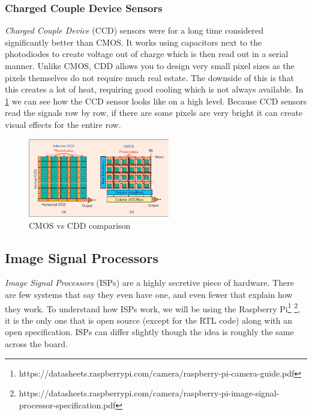 \subsubsection{Charged Couple Device Sensors}
\textit{Charged Couple Device} (CCD) sensors were for a long time considered
significantly better than CMOS. It works using capacitors next to the
photodiodes to create voltage out of charge which is then read out in a serial
manner. Unlike CMOS, CDD allows you to design very small pixel sizes as the
pixels themselves do not require much real estate. The downside of this is that
this creates a lot of heat, requiring good cooling which is not always
available. In \cref{fig:cmosvsccd} we can see how the CCD sensor looks like on
a high level. Because CCD sensors read the signals row by row, if there are some
pixels are very bright it can create visual effects for the entire row.

\begin{figure}
    \begin{center}
        \includegraphics[width=0.55\textwidth]{figures/cmos_vs_cdd}
    \end{center}
    \caption{CMOS vs CDD comparison\cite{ieeeCMOS}}\label{fig:cmosvsccd}
\end{figure}


\newpage
\subsection{Image Signal Processors} \label{section:isp}
\textit{Image Signal Processors} (ISPs) are a highly secretive piece of
hardware. There are few systems that say they even have one, and even fewer
that explain how they work. To understand how ISPs work, we will be using the
Raspberry Pi\footnote{https://datasheets.raspberrypi.com/camera/raspberry-pi-camera-guide.pdf}
\footnote{https://datasheets.raspberrypi.com/camera/raspberry-pi-image-signal-processor-specification.pdf},
it is the only one that is open source (except for the RTL code) along with an
open specification. ISPs can differ slightly though the idea is roughly the
same across the board.

